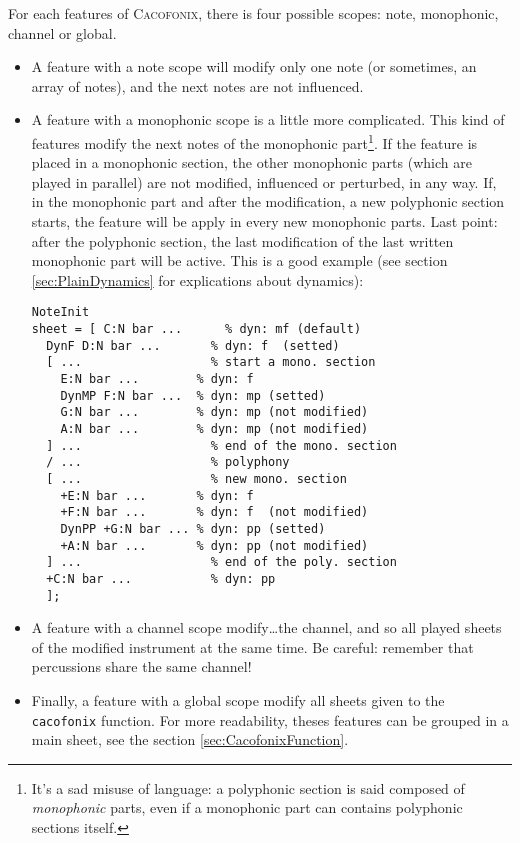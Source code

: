 \documentclass{article}
\newcommand{\cacofonix}{\textsc{Cacofonix}\xspace}
\begin{document}
For each features of \cacofonix, there is four possible scopes: note, monophonic, channel or global.
\begin{itemize}
  \item A feature with a note scope will modify only one note (or sometimes, an array of notes), and the next notes are not influenced.
  \item A feature with a monophonic scope is a little more complicated. This kind of features modify the next notes of the monophonic part\footnote{It's a sad misuse of language: a polyphonic section is said composed of \emph{monophonic} parts, even if a monophonic part can contains polyphonic sections itself.}. If the feature is placed in a monophonic section, the other monophonic parts (which are played in parallel) are not modified, influenced or perturbed, in any way. If, in the monophonic part and after the modification, a new polyphonic section starts, the feature will be apply in every new monophonic parts. Last point: after the polyphonic section, the last modification of the last written monophonic part will be active. This is a good example (see section \ref{sec:PlainDynamics} for explications about dynamics):
\begin{lstlisting}
NoteInit
sheet = [ C:N bar ...      % dyn: mf (default)
  DynF D:N bar ...       % dyn: f  (setted)
  [ ...                  % start a mono. section
    E:N bar ...        % dyn: f
    DynMP F:N bar ...  % dyn: mp (setted)
    G:N bar ...        % dyn: mp (not modified)
    A:N bar ...        % dyn: mp (not modified)
  ] ...                  % end of the mono. section
  / ...                  % polyphony
  [ ...                  % new mono. section
    +E:N bar ...       % dyn: f
    +F:N bar ...       % dyn: f  (not modified)
    DynPP +G:N bar ... % dyn: pp (setted)
    +A:N bar ...       % dyn: pp (not modified)
  ] ...                  % end of the poly. section
  +C:N bar ...           % dyn: pp
  ];
\end{lstlisting}
  \item A feature with a channel scope modify\dots the channel, and so all played sheets of the modified instrument at the same time. Be careful: remember that percussions share the same channel!
  \item Finally, a feature with a global scope modify all sheets given to the \lstinline!cacofonix! function. For more readability, theses features can be grouped in a main sheet, see the section \ref{sec:CacofonixFunction}.
\end{itemize}
\end{document}
